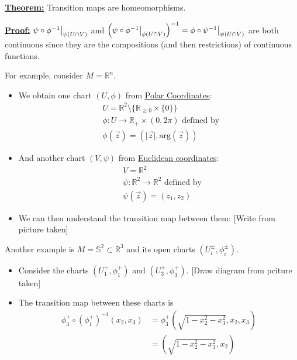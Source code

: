 \documentclass{article}
\newcommand{\restr}[2]{{%
  \left.\kern-\nulldelimiterspace %
  #1 %
  \vphantom{\big|} %
  \right|_{#2} %
  }}
\begin{document}
\vskip 1cm
\begin{dottedbox}
  \underline{\textbf{Theorem:}} Transition maps are homeomorphisms.

  \vskip 0.5cm
  \underline{\textbf{Proof:}} $\restr{\psi \circ \phi^{-1}}{\psi(U \cap V)}$ and $\left( \restr{\psi \circ \phi^{-1}}{\phi(U \cap V)} \right)^{-1} = \restr{\phi \circ \psi^{-1}}{\psi(U \cap V)} $ are both continuous since they are the compositions (and then restrictions) of continuous functions.
\end{dottedbox}

\vskip 1cm
For example, consider $M = \mathbb{R}^n$. 
\begin{itemize}
  \item We obtain one chart $(U, \phi)$ from \underline{Polar Coordinates}:
  \begin{align*}
    &U = \mathbb{R}^2 \setminus \{ \mathbb{R}_{\geq 0} \times \{ 0 \} \}\\
    &\phi : U \rightarrow \mathbb{R}_{+} \times (0, 2\pi) \text{ defined by } \\
    &\phi(\vec{z}) = (\lvert \vec{z} \rvert, \text{arg}(\vec{z}))
  \end{align*}

  \item And another chart $(V, \psi)$ from \underline{Euclidean coordinates}:
  \begin{align*}
    &V = \mathbb{R}^2 \\
    &\psi : \mathbb{R}^2 \rightarrow \mathbb{R}^2 \text{ defined by} \\
    &\psi(\vec{z}) = (z_1, z_2)
  \end{align*}
  \item We can then understand the transition map between them: [Write from picture taken]
\end{itemize}

\vskip 1cm
Another example is $M = \mathbb{S}^2 \subset \mathbb{R}^3$ and its open charts $(U_i^{\pm}, \phi_i^{\pm})$.

\begin{itemize}
  \item Consider the charts $(U_1^+, \phi_1^+)$ and $(U_3^+, \phi_3^+)$. [Draw diagram from pciture taken]
  \item The transition map between these charts is 
  \begin{align*}
    \phi_3^+ \circ (\phi_1^+)^{-1} (x_2, x_3) &= \phi_3^+(\sqrt{1-x_2^2 -x_3^2}, x_2, x_3) \\
    &= (\sqrt{1-x_2^2-x_3^2}, x_2)
  \end{align*}
\end{itemize}
\end{document}
